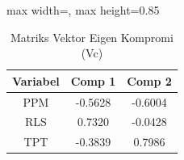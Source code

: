 \begin{table}[H]
\centering
\caption{Matriks Vektor Eigen Kompromi (Vc)} \label{tab:vc}
\begin{adjustbox}{max width=\textwidth, max height=0.85\textheight}
\begin{tabular}{|c|c|c|}
\hline
\textbf{Variabel} & \textbf{Comp 1} & \textbf{Comp 2} \\
\hline
PPM & -0.5628 & -0.6004 \\
RLS & 0.7320 & -0.0428 \\
TPT & -0.3839 & 0.7986 \\
\hline
\end{tabular}
\end{adjustbox}
\end{table}